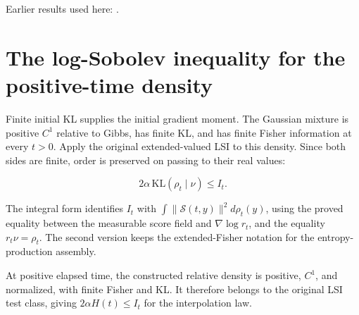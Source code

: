 \documentclass[11pt,a4paper]{article}
\begin{document}
Earlier results used here: \cite[Section~3.26.3]{LangevinLean2026ULASC}.

\section{\texorpdfstring{The log-Sobolev inequality for the positive-time density}{The log-Sobolev inequality for the positive-time density}}


Finite initial KL supplies the initial gradient moment. The Gaussian mixture is positive \(C^1\) relative to Gibbs, has finite KL, and has finite Fisher information at every \(t>0\). Apply the original extended-valued LSI to this density. Since both sides are finite, order is preserved on passing to their real values:

\[2\alpha\,\mathrm{KL}(\rho_t\mid\nu)\le I_t.\]

The integral form identifies \(I_t\) with \(\int\|\mathcal S(t,y)\|^2d\rho_t(y)\), using the proved equality between the measurable score field and \(\nabla\log r_t\), and the equality \(r_t\nu=\rho_t\). The second version keeps the extended-Fisher notation for the entropy-production assembly.



At positive elapsed time, the constructed relative density is positive, \(C^1\), and normalized, with finite Fisher and KL. It therefore belongs to the original LSI test class, giving \(2\alpha H(t)\le I_t\) for the interpolation law.
\end{document}
